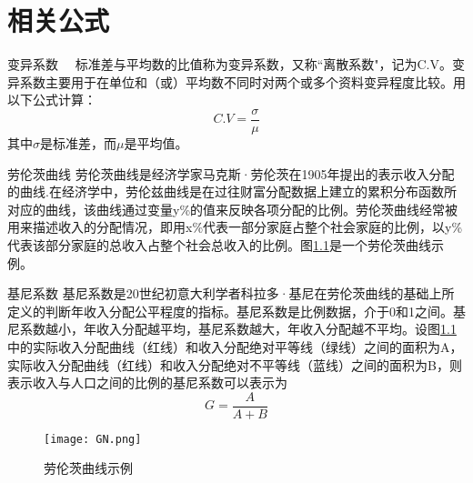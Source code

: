 
\chapter{相关公式}
\begin{section}{变异系数}
　标准差与平均数的比值称为变异系数，又称“离散系数"，记为C.V。变异系数主要用于在单位和（或）平均数不同时对两个或多个资料变异程度比较。用以下公式计算：
\begin{equation}
    C.V = \frac{\sigma }{\mu }
\end{equation}
其中$\sigma$是标准差，而$\mu$是平均值。
\end{section}


\begin{section}{劳伦茨曲线}
劳伦茨曲线是经济学家马克斯·劳伦茨在1905年提出的表示收入分配的曲线.在经济学中，劳伦兹曲线是在过往财富分配数据上建立的累积分布函数所对应的曲线，该曲线通过变量y\%的值来反映各项分配的比例。劳伦茨曲线经常被用来描述收入的分配情况，即用x\%代表一部分家庭占整个社会家庭的比例，以y\%代表该部分家庭的总收入占整个社会总收入的比例。图\ref{Fig:GN}是一个劳伦茨曲线示例。
\end{section}


\begin{section}{基尼系数}
基尼系数是20世纪初意大利学者科拉多·基尼在劳伦茨曲线的基础上所定义的判断年收入分配公平程度的指标。基尼系数是比例数据，介于0和1之间。基尼系数越小，年收入分配越平均，基尼系数越大，年收入分配越不平均。设图\ref{Fig:GN}中的实际收入分配曲线（红线）和收入分配绝对平等线（绿线）之间的面积为A，实际收入分配曲线（红线）和收入分配绝对不平等线（蓝线）之间的面积为B，则表示收入与人口之间的比例的基尼系数可以表示为
\begin{equation}
    G = \frac{A }{A+B }
\end{equation}

\end{section}

\begin{figure}[H]
	\centering
	\texttt{[image: GN.png]}
	\caption{劳伦茨曲线示例}
	\label{Fig:GN}
\end{figure}
